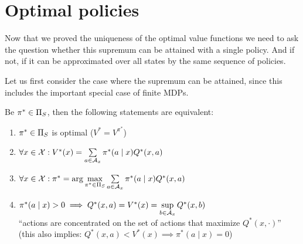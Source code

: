 \section{Optimal policies}
Now that we proved the uniqueness of the optimal value functions we need to ask the question whether this supremum can be attained with a single policy. And if not, if it can be approximated over all states by the same sequence of policies. 

Let us first consider the case where the supremum can be attained, since this includes the important special case of finite MDPs.  

\begin{prop}\label{sup is attained}Be \(\pi^*\in\Pi_S\), then the following statements are equivalent:
\begin{enumerate}[label={(\roman*)},font=\normalfont]
\item \label{ii:1}\(\pi^* \in\Pi_S\) is optimal (\(V^*=V^{\pi^*}\))
\item \label{ii:2} \(\forall x\in\mathcal{X}: V^*(x)=\sum\limits_{a\in\mathcal{A}_x}\pi^*(a\mid x)Q^*(x,a)\)
\item\label{ii:3} \(\forall x\in\mathcal{X}: \pi^*=\arg\max\limits_{\pi^*\in\Pi_S}\sum\limits_{a\in\mathcal{A}_x}\pi^*(a\mid x)Q^*(x,a) \)
\item\label{ii:4} \(\pi^*(a\mid x)>0 \implies Q^*(x,a)=V^*(x) =\sup\limits_{b\in\mathcal{A}_x}Q^*(x,b)\) \\
	``actions are concentrated on the set of actions that maximize \(Q^*(x,\cdot)\)''\\
	(this also implies: \(Q^*(x,a)<V^*(x) \implies \pi^*(a\mid x)=0\))
\end{enumerate}
\end{prop}

